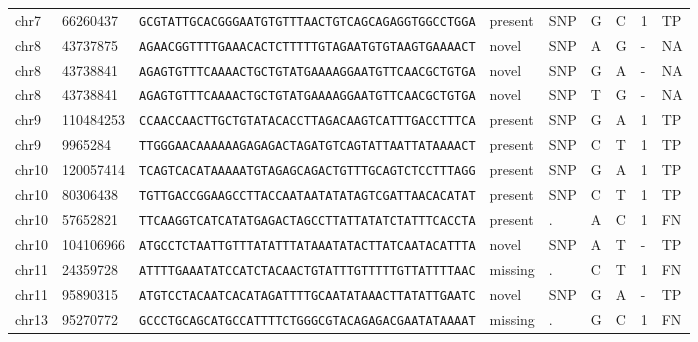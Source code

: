\begin{landscape}
\begin{table}[]
\begin{tabular}{@{}lllllllll@{}}
chr7  & 66260437  & \texttt{GCGTATTGCACGGGAATGTGTTTAACTGTCAGCAGAGGTGGCCTGGA} & present            & SNP       & G        & C                   & 1         & TP     \\
chr8  & 43737875  & \texttt{AGAACGGTTTTGAAACACTCTTTTTGTAGAATGTGTAAGTGAAAACT} & novel              & SNP       & A        & G                   & -         & NA     \\
chr8  & 43738841  & \texttt{AGAGTGTTTCAAAACTGCTGTATGAAAAGGAATGTTCAACGCTGTGA} & novel              & SNP       & G        & A                   & -         & NA     \\
chr8  & 43738841  & \texttt{AGAGTGTTTCAAAACTGCTGTATGAAAAGGAATGTTCAACGCTGTGA} & novel              & SNP       & T        & G                   & -         & NA     \\
chr9  & 110484253 & \texttt{CCAACCAACTTGCTGTATACACCTTAGACAAGTCATTTGACCTTTCA} & present            & SNP       & G        & A                   & 1         & TP     \\
chr9  & 9965284   & \texttt{TTGGGAACAAAAAAGAGAGACTAGATGTCAGTATTAATTATAAAACT} & present            & SNP       & C        & T                   & 1         & TP     \\
chr10 & 120057414 & \texttt{TCAGTCACATAAAAATGTAGAGCAGACTGTTTGCAGTCTCCTTTAGG} & present            & SNP       & G        & A                   & 1         & TP     \\
chr10 & 80306438  & \texttt{TGTTGACCGGAAGCCTTACCAATAATATATAGTCGATTAACACATAT} & present            & SNP       & C        & T                   & 1         & TP     \\
chr10 & 57652821  & \texttt{TTCAAGGTCATCATATGAGACTAGCCTTATTATATCTATTTCACCTA} & present            & .         & A        & C                   & 1         & FN     \\
chr10 & 104106966 & \texttt{ATGCCTCTAATTGTTTATATTTATAAATATACTTATCAATACATTTA} & novel              & SNP       & A        & T                   & -         & TP     \\
chr11 & 24359728  & \texttt{ATTTTGAAATATCCATCTACAACTGTATTTGTTTTTGTTATTTTAAC} & missing            & .         & C        & T                   & 1         & FN     \\
chr11 & 95890315  & \texttt{ATGTCCTACAATCACATAGATTTTGCAATATAAACTTATATTGAATC} & novel              & SNP       & G        & A                   & -         & TP     \\
chr13 & 95270772  & \texttt{GCCCTGCAGCATGCCATTTTCTGGGCGTACAGAGACGAATATAAAAT} & missing            & .         & G        & C                   & 1         & FN     \\

\end{tabular}
\end{table}
\end{landscape}
